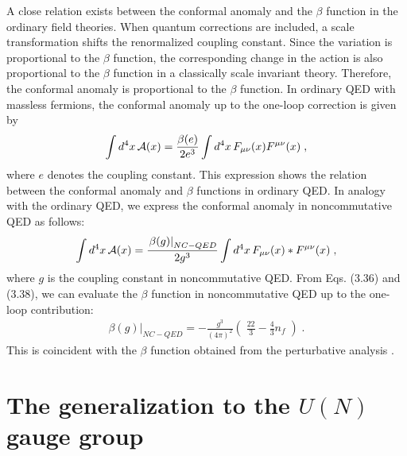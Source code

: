 \documentclass[a4paper,12pt]{article}
\begin{document}
A close relation exists between the conformal anomaly and the $\beta$ function 
in the ordinary field theories. When quantum corrections are 
included, a scale transformation shifts the renormalized coupling constant. 
Since the variation is proportional to the $\beta$ function, the corresponding 
change in the action is also proportional to the $\beta$ function in a 
classically scale invariant theory. Therefore, the conformal anomaly is 
proportional to the $\beta$ function. In ordinary QED with massless fermions, 
the conformal anomaly up to the one-loop correction is given by 
%
\begin{eqnarray}
\int d^{4}x \,{\cal A}(x) 
= \frac{\beta(e)}{2e^{3}} \int d^{4}x \, 
F_{\mu\nu}(x)F^{\mu\nu}(x) \;,
\end{eqnarray}
%
where $e$ denotes the coupling constant. This expression shows the relation 
between the conformal anomaly and $\beta$ functions in ordinary QED. 
In analogy with the ordinary QED, we express the conformal anomaly 
in noncommutative QED as follows: 
%
\begin{eqnarray}
\int d^{4}x \,{\cal A}(x) 
= \frac{\left. \beta(g) \right|_{NC-QED}}{2g^{3}} 
\int d^{4}x \, F_{\mu\nu}(x) \ast F^{\mu\nu}(x) \;,
\end{eqnarray}
%
where $g$ is the coupling constant in noncommutative QED. From Eqs. (3.36) 
and (3.38), we can evaluate the $\beta$ function in noncommutative QED up to 
the one-loop contribution:
%
\begin{eqnarray}
\left. \beta(g) \right|_{NC-QED} = -\frac{g^{3}}{(4\pi)^{2}}
\left(\;\frac{22}{3} - \frac{4}{3}n_{f} \;\right) \;. 
\end{eqnarray}
%
This is coincident with the $\beta$ function obtained from the perturbative 
analysis \footnotemark[2] \cite{MH}.  
%
%
%

%
%
\section{The generalization to the $U(N)$ gauge group}
\setcounter{equation}{0}
\addtocounter{enumi}{1}
%
\end{document}
